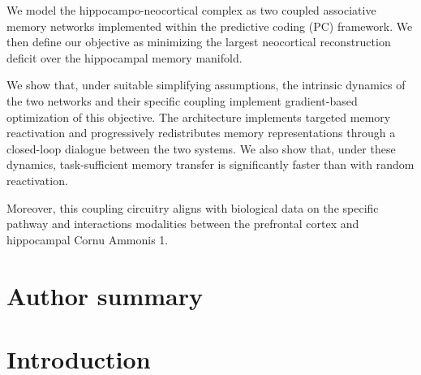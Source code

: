 \documentclass[10pt,letterpaper]{article}
\theoremstyle{plain}
\theoremstyle{remark}
\begin{document}
We model the hippocampo-neocortical complex as two coupled associative memory networks implemented within the predictive coding (PC) framework. We then define our objective as minimizing the largest neocortical reconstruction deficit over the hippocampal memory manifold.

We show that, under suitable simplifying assumptions, the intrinsic dynamics of the two networks and their specific coupling implement gradient-based optimization of this objective. The architecture implements targeted memory reactivation and progressively redistributes memory representations through a closed-loop dialogue between the two systems. We also show that, under these dynamics, task-sufficient memory transfer is significantly faster than with random reactivation.

Moreover, this coupling circuitry aligns with biological data on the specific pathway and interactions modalities between the prefrontal cortex and hippocampal Cornu Ammonis 1.

\section*{Author summary}


\linenumbers

\newpage
\section{Introduction}

\end{document}
